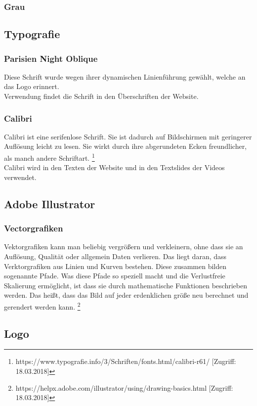 \subsubsection{Grau}
\subsection{Typografie}
\subsubsection{Parisien Night Oblique}
Diese Schrift wurde wegen ihrer dynamischen Linienführung gewählt, welche an das Logo erinnert.
\\
Verwendung findet die Schrift in den Überschriften der Website.

\subsubsection{Calibri}
Calibri ist eine serifenlose Schrift. Sie ist dadurch auf Bildschirmen mit geringerer Auflösung leicht zu lesen. Sie wirkt durch ihre abgerundeten Ecken freundlicher, als manch andere Schriftart. \footnote{\label{foot:2} https://www.typografie.info/3/Schriften/fonts.html/calibri-r61/ [Zugriff: 18.03.2018]}
\\
Calibri wird in den Texten der Website und in den Textslides der Videos verwendet.

\subsection{Adobe Illustrator}
\subsubsection{Vectorgrafiken}
Vektorgrafiken kann man beliebig vergrößern und verkleinern, ohne dass sie an Auflösung, Qualität oder allgemein Daten verlieren. Das liegt daran, dass Verktorgrafiken aus Linien und Kurven bestehen. Diese zusammen bilden sogenannte Pfade. Was diese Pfade so speziell macht und die Verlustfreie Skalierung ermöglicht, ist dass sie durch mathematische Funktionen beschrieben werden. Das heißt, dass das Bild auf jeder erdenklichen größe neu berechnet und gerendert werden kann.
\footnote{\label{foot:1} https://helpx.adobe.com/illustrator/using/drawing-basics.html [Zugriff: 18.03.2018]}

\subsection{Logo}
